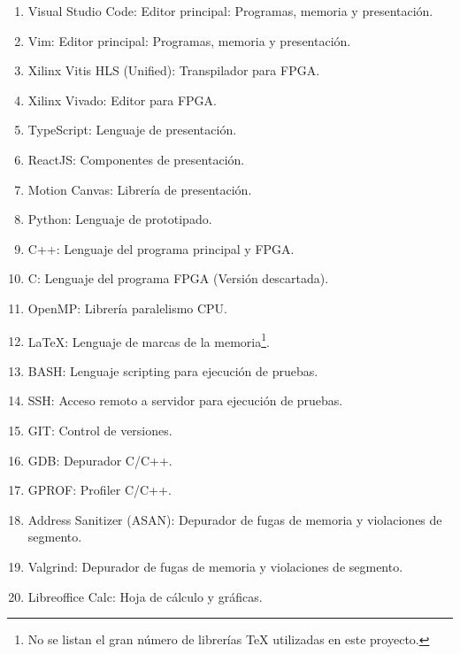\begin{enumerate}[itemsep=0.25px]
    \item Visual Studio Code: Editor principal: Programas, memoria y presentación.
    \item Vim: Editor principal: Programas, memoria y presentación.
    \item Xilinx Vitis HLS (Unified): Transpilador para FPGA.
    \item Xilinx Vivado: Editor para FPGA.
    \item TypeScript: Lenguaje de presentación.
    \item ReactJS: Componentes de presentación.
    \item Motion Canvas: Librería de presentación.
    \item Python: Lenguaje de prototipado.
    \item C++: Lenguaje del programa principal y FPGA.
    \item C: Lenguaje del programa FPGA (Versión descartada).
    \item OpenMP: Librería paralelismo CPU.
    \item LaTeX: Lenguaje de marcas de la memoria\footnote{
        No se listan el gran número de librerías TeX utilizadas en este proyecto.
    }.
    \item BASH: Lenguaje scripting para ejecución de pruebas.
    \item SSH: Acceso remoto a servidor para ejecución de pruebas.
    \item GIT: Control de versiones.
    \item GDB: Depurador C/C++.
    \item GPROF: Profiler C/C++.
    \item Address Sanitizer (ASAN): Depurador de fugas de memoria y violaciones de segmento.
    \item Valgrind: Depurador de fugas de memoria y violaciones de segmento.
    \item Libreoffice Calc: Hoja de cálculo y gráficas.
\end{enumerate}
